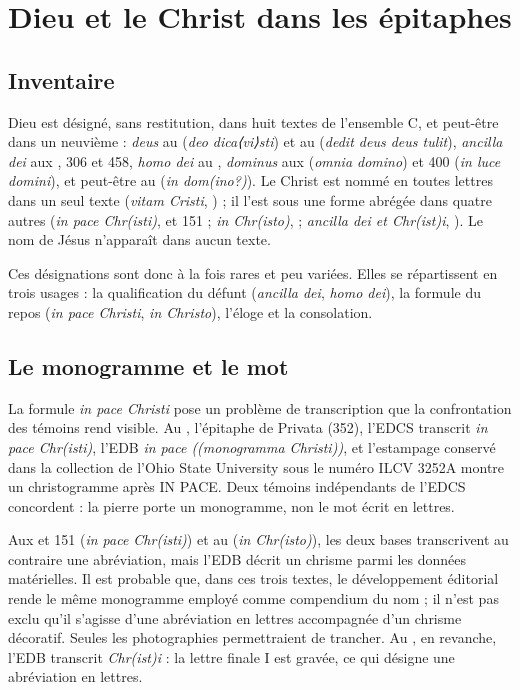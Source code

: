 \chapter{Dieu et le Christ dans les épitaphes}\label{ch:dieu_christ}

\section{Inventaire}

Dieu est désigné, sans restitution, dans huit textes de l’ensemble C, et peut-être dans un neuvième : \emph{deus} au  (\emph{deo dica⟨vi⟩sti}) et au  (\emph{dedit deus deus tulit}), \emph{ancilla dei} aux , 306 et 458, \emph{homo dei} au , \emph{dominus} aux  (\emph{omnia domino}) et 400 (\emph{in luce domini}), et peut-être au  (\emph{in dom(ino?)}). Le Christ est nommé en toutes lettres dans un seul texte (\emph{vitam Cristi}, ) ; il l’est sous une forme abrégée dans quatre autres (\emph{in pace Chr(isti)},  et 151 ; \emph{in Chr(isto)},  ; \emph{ancilla dei et Chr(ist)i}, ). Le nom de Jésus n’apparaît dans aucun texte.

Ces désignations sont donc à la fois rares et peu variées. Elles se répartissent en trois usages : la qualification du défunt (\emph{ancilla dei}, \emph{homo dei}), la formule du repos (\emph{in pace Christi}, \emph{in Christo}), l’éloge et la consolation.

\section{Le monogramme et le mot}

La formule \emph{in pace Christi} pose un problème de transcription que la confrontation des témoins rend visible. Au , l’épitaphe de Privata (352), l’EDCS transcrit \emph{in pace Chr(isti)}, l’EDB \emph{in pace ((monogramma Christi))}, et l’estampage conservé dans la collection de l’Ohio State University sous le numéro ILCV 3252A montre un christogramme après IN PACE. Deux témoins indépendants de l’EDCS concordent : la pierre porte un monogramme, non le mot écrit en lettres.

Aux  et 151 (\emph{in pace Chr(isti)}) et au  (\emph{in Chr(isto)}), les deux bases transcrivent au contraire une abréviation, mais l’EDB décrit un chrisme parmi les données matérielles. Il est probable que, dans ces trois textes, le développement éditorial rende le même monogramme employé comme compendium du nom ; il n’est pas exclu qu’il s’agisse d’une abréviation en lettres accompagnée d’un chrisme décoratif. Seules les photographies permettraient de trancher. Au , en revanche, l’EDB transcrit \emph{Chr(ist)i} : la lettre finale I est gravée, ce qui désigne une abréviation en lettres.

